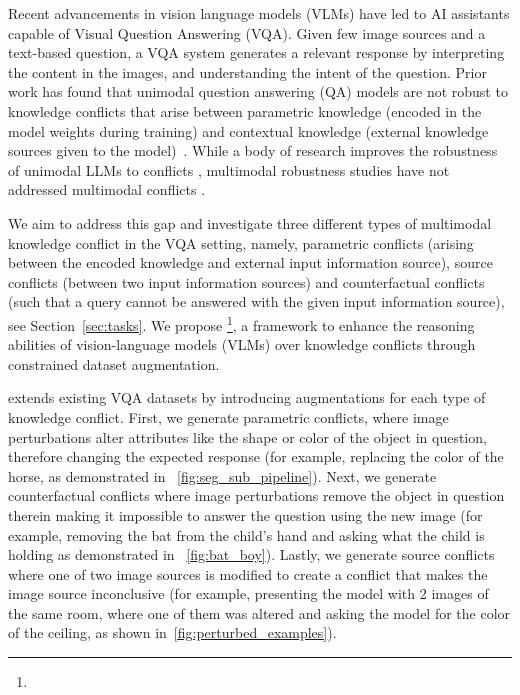 
Recent advancements in vision language models (VLMs) have led to AI assistants capable of Visual Question Answering (VQA). Given few image sources and a text-based question, a VQA system generates a relevant response by interpreting the content in the images, and understanding the intent of the question.
Prior work has found that unimodal question answering (QA) models are not robust to knowledge conflicts that arise between parametric knowledge (encoded in the model weights during training) and contextual knowledge (external knowledge sources given to the model)~\citep{neeman_disentqa_2022}. While a body of research improves the robustness of unimodal LLMs to conflicts \citep{longpre_entity-based_2022}, multimodal robustness studies \citep{liu2024visual} have not addressed multimodal conflicts \citep{conflicts-main-survey}.

We aim to address this gap and investigate three different types of multimodal knowledge conflict in the VQA setting, namely, parametric conflicts (arising between the encoded knowledge and external input information source), source conflicts (between two input information sources) and counterfactual conflicts (such that a query cannot be answered with the given input information source), see Section~\ref{sec:tasks}. We propose \segsub\footnote{\codebaseurl},
a framework to enhance the reasoning abilities of vision-language models (VLMs) over knowledge conflicts through constrained dataset augmentation.

\segsub extends existing VQA datasets by introducing augmentations for each type of knowledge conflict. First, we generate parametric conflicts, where image perturbations alter attributes like the shape or color of the object in question, therefore changing the expected response (for example, replacing the color of the horse, as demonstrated in ~\autoref{fig:seg_sub_pipeline}). Next, we generate counterfactual conflicts where image perturbations remove the object in question therein making it impossible to answer the question using the new image (for example, removing the bat from the child's hand and asking what the child is holding as demonstrated in ~\autoref{fig:bat_boy}). Lastly, we generate source conflicts where one of two image sources is modified to create a conflict that makes the image source inconclusive (for example, presenting the model with 2 images of the same room, where one of them was altered and asking the model for the color of the ceiling, as shown in~\autoref{fig:perturbed_examples}).  

